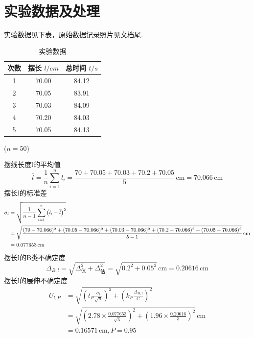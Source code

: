 \documentclass[UTF8]{ctexart}
\begin{document}
\section{实验数据及处理}
实验数据见下表，原始数据记录照片见文档尾.
\begin{table}[H]\centering
    \begin{tabular}{ccc}
        \hline\hline
        次数 & 摆长 $l/cm$ & 总时间 $t/s$ \\
        \hline
        1 & 70.00 & 84.12 \\
        2 & 70.05 & 83.91 \\
        3 & 70.03 & 84.09 \\
        4 & 70.20 & 84.03 \\
        5 & 70.05 & 84.13 \\
        \hline\hline
    \end{tabular}%
    \qquad
    ($n=50$)
    \caption{实验数据}
\end{table}
\noindent 摆线长度l的平均值
$$
\overline{l}=\frac{1}{n}\sum_{i=1}^{n}l_i=\frac{70+70.05+70.03+70.2+70.05}{5}\,\mathrm{cm}=70.066\,\mathrm{cm}
$$
摆长l的标准差
$$
\begin{small}
\begin{aligned}
\sigma_{l}&=\sqrt{\frac{1}{n-1}\sum_{i=1}^n\left(l_i-\overline{l}\right)^2}\\
&=\sqrt{\frac{(70-70.066)^2+(70.05-70.066)^2+(70.03-70.066)^2+(70.2-70.066)^2+(70.05-70.066)^2}{5-1}}\,\mathrm{cm}\\
&=0.077653\,\mathrm{cm}
\end{aligned}
\end{small}
$$
摆长l的B类不确定度
$$
\Delta_{B,l}=\sqrt{\Delta_\text{仪}^2+\Delta_\text{估}^2}=\sqrt{0.2^2+0.05^2}\,\mathrm{cm}=0.20616\,\mathrm{cm}
$$
摆长l的展伸不确定度
$$
\begin{aligned}
U_{l,P}&=\sqrt{\left(t_P\frac{\sigma_{l}}{\sqrt{n}}\right)^2+\left(k_P\frac{\Delta_{B,l}}{C}\right)^2}\\
&=\sqrt{\left(2.78\times\frac{0.077653}{\sqrt{5}}\right)^2+\left(1.96\times\frac{0.20616}{3}\right)^2}\,\mathrm{cm}\\
&=0.16571\,\mathrm{cm},P=0.95
\end{aligned}
$$
\end{document}
